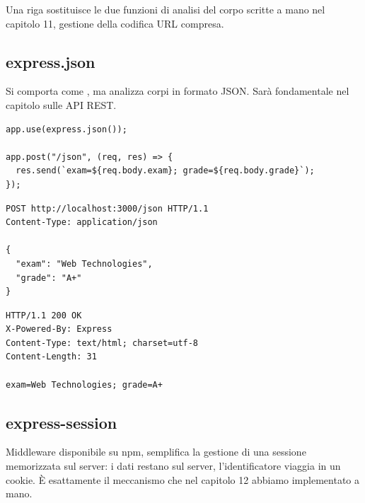 Una riga sostituisce le due funzioni di analisi del corpo scritte a mano nel
capitolo 11, gestione della codifica URL compresa.

\subsection{express.json}

Si comporta come , ma analizza corpi in formato JSON.
Sarà fondamentale nel capitolo sulle API REST.

\begin{lstlisting}[style=js]
app.use(express.json());

app.post("/json", (req, res) => {
  res.send(`exam=${req.body.exam}; grade=${req.body.grade}`);
});
\end{lstlisting}

\begin{affianco}[0.5]
\begin{lstlisting}[style=http, name=Richiesta]
POST http://localhost:3000/json HTTP/1.1
Content-Type: application/json

{
  "exam": "Web Technologies",
  "grade": "A+"
}
\end{lstlisting}
\risultato
\begin{lstlisting}[style=http, name=Risposta]
HTTP/1.1 200 OK
X-Powered-By: Express
Content-Type: text/html; charset=utf-8
Content-Length: 31

exam=Web Technologies; grade=A+
\end{lstlisting}
\end{affianco}

\subsection{express-session}

Middleware disponibile su npm, semplifica la gestione di una sessione
memorizzata sul server: i dati restano sul server, l'identificatore viaggia in
un cookie. È esattamente il meccanismo che nel capitolo 12 abbiamo implementato
a mano.


